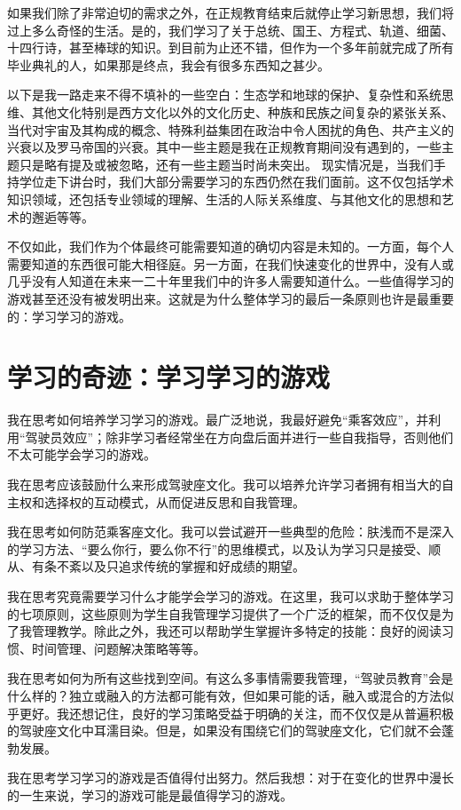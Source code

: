 如果我们除了非常迫切的需求之外，在正规教育结束后就停止学习新思想，我们将过上多么奇怪的生活。是的，我们学习了关于总统、国王、方程式、轨道、细菌、十四行诗，甚至棒球的知识。到目前为止还不错，但作为一个多年前就完成了所有毕业典礼的人，如果那是终点，我会有很多东西知之甚少。

以下是我一路走来不得不填补的一些空白：生态学和地球的保护、复杂性和系统思维、其他文化特别是西方文化以外的文化历史、种族和民族之间复杂的紧张关系、当代对宇宙及其构成的概念、特殊利益集团在政治中令人困扰的角色、共产主义的兴衰以及罗马帝国的兴衰。其中一些主题是我在正规教育期间没有遇到的，一些主题只是略有提及或被忽略，还有一些主题当时尚未突出。
现实情况是，当我们手持学位走下讲台时，我们大部分需要学习的东西仍然在我们面前。这不仅包括学术知识领域，还包括专业领域的理解、生活的人际关系维度、与其他文化的思想和艺术的邂逅等等。

不仅如此，我们作为个体最终可能需要知道的确切内容是未知的。一方面，每个人需要知道的东西很可能大相径庭。另一方面，在我们快速变化的世界中，没有人或几乎没有人知道在未来一二十年里我们中的许多人需要知道什么。一些值得学习的游戏甚至还没有被发明出来。这就是为什么整体学习的最后一条原则也许是最重要的：学习学习的游戏。

\section*{学习的奇迹：学习学习的游戏}

我在思考如何培养学习学习的游戏。最广泛地说，我最好避免“乘客效应”，并利用“驾驶员效应”；除非学习者经常坐在方向盘后面并进行一些自我指导，否则他们不太可能学会学习的游戏。

我在思考应该鼓励什么来形成驾驶座文化。我可以培养允许学习者拥有相当大的自主权和选择权的互动模式，从而促进反思和自我管理。

我在思考如何防范乘客座文化。我可以尝试避开一些典型的危险：肤浅而不是深入的学习方法、“要么你行，要么你不行”的思维模式，以及认为学习只是接受、顺从、有条不紊以及只追求传统的掌握和好成绩的期望。

我在思考究竟需要学习什么才能学会学习的游戏。在这里，我可以求助于整体学习的七项原则，这些原则为学生自我管理学习提供了一个广泛的框架，而不仅仅是为了我管理教学。除此之外，我还可以帮助学生掌握许多特定的技能：良好的阅读习惯、时间管理、问题解决策略等等。

我在思考如何为所有这些找到空间。有这么多事情需要我管理，“驾驶员教育”会是什么样的？独立或融入的方法都可能有效，但如果可能的话，融入或混合的方法似乎更好。我还想记住，良好的学习策略受益于明确的关注，而不仅仅是从普遍积极的驾驶座文化中耳濡目染。但是，如果没有围绕它们的驾驶座文化，它们就不会蓬勃发展。

我在思考学习学习的游戏是否值得付出努力。然后我想：对于在变化的世界中漫长的一生来说，学习的游戏可能是最值得学习的游戏。

